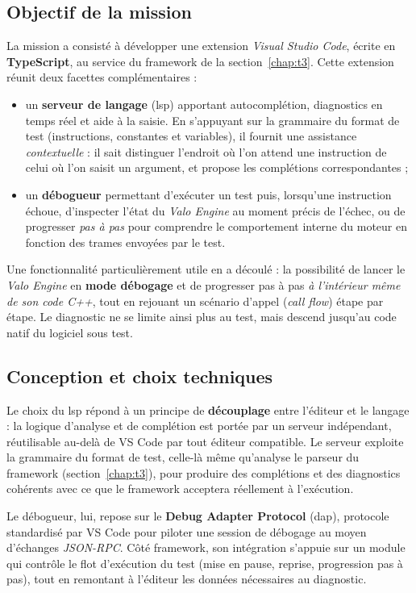 \subsection{Objectif de la mission}
La mission a consisté à développer une extension \emph{Visual Studio Code},
écrite en \textbf{TypeScript}, au service du framework de la
section~\ref{chap:t3}. Cette
extension réunit deux facettes complémentaires :
\begin{itemize}
  \item un \textbf{serveur de langage} (\gls{lsp}) apportant autocomplétion,
        diagnostics en temps réel et aide à la saisie. En s'appuyant sur la
        grammaire du format de test (instructions, constantes et variables),
        il fournit une assistance \emph{contextuelle} : il sait distinguer
        l'endroit où l'on attend une instruction de celui où l'on saisit un
        argument, et propose les complétions correspondantes ;
  \item un \textbf{débogueur} permettant d'exécuter un test puis, lorsqu'une
        instruction échoue, d'inspecter l'état du \emph{Valo Engine} au moment
        précis de l'échec, ou de progresser \emph{pas à pas} pour comprendre le
        comportement interne du moteur en fonction des trames envoyées par le
        test.
\end{itemize}

Une fonctionnalité particulièrement utile en a découlé : la possibilité de lancer
le \emph{Valo Engine} en \textbf{mode débogage} et de progresser pas à pas
\emph{à l'intérieur même de son code C++}, tout en rejouant un scénario d'appel
(\emph{call flow}) étape par étape. Le diagnostic ne se limite ainsi plus au
test, mais descend jusqu'au code natif du logiciel sous test.

\subsection{Conception et choix techniques}
Le choix du \gls{lsp} répond à un principe de \textbf{découplage} entre l'éditeur
et le langage : la logique d'analyse et de complétion est portée par un serveur
indépendant, réutilisable au-delà de VS Code par tout éditeur compatible. Le
serveur exploite la grammaire du format de test, celle-là même qu'analyse le
parseur du framework (section~\ref{chap:t3}), pour produire des complétions et
des diagnostics cohérents avec ce que le framework acceptera réellement à
l'exécution.

Le débogueur, lui, repose sur le \textbf{Debug Adapter Protocol} (\gls{dap}),
protocole standardisé par VS Code pour piloter une session de débogage au moyen
d'échanges \emph{JSON-RPC}. Côté framework, son intégration s'appuie sur un
module qui contrôle le flot d'exécution du test (mise en pause, reprise,
progression pas à pas), tout en remontant à l'éditeur les données nécessaires au
diagnostic.

